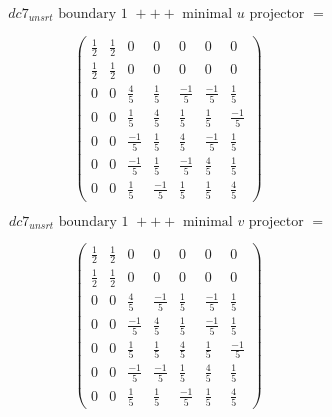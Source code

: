\documentclass[preprint]{iucr}              %
\begin{document}
{\begin{itemize}
{\[dc7_{unsrt} \text{ boundary 1 } +++ \text{ minimal }u \text{ projector } =\]
\begin{center}
\begin{equation*}
\begin{pmatrix}
\frac{1}{2}&\frac{1}{2}&0&0&0&0&0\\[.25em]
\frac{1}{2}&\frac{1}{2}&0&0&0&0&0\\[.25em]
0&0&\frac{4}{5}&\frac{1}{5}&\frac{-1}{5}&\frac{-1}{5}&\frac{1}{5}\\[.25em]
0&0&\frac{1}{5}&\frac{4}{5}&\frac{1}{5}&\frac{1}{5}&\frac{-1}{5}\\[.25em]
0&0&\frac{-1}{5}&\frac{1}{5}&\frac{4}{5}&\frac{-1}{5}&\frac{1}{5}\\[.25em]
0&0&\frac{-1}{5}&\frac{1}{5}&\frac{-1}{5}&\frac{4}{5}&\frac{1}{5}\\[.25em]
0&0&\frac{1}{5}&\frac{-1}{5}&\frac{1}{5}&\frac{1}{5}&\frac{4}{5}
\end{pmatrix}
\end{equation*}
\end{center}


\[dc7_{unsrt} \text{ boundary 1 } +++ \text{ minimal }v \text{ projector } =\]
\begin{center}
\begin{equation*}
\begin{pmatrix}
\frac{1}{2}&\frac{1}{2}&0&0&0&0&0\\[.25em]
\frac{1}{2}&\frac{1}{2}&0&0&0&0&0\\[.25em]
0&0&\frac{4}{5}&\frac{-1}{5}&\frac{1}{5}&\frac{-1}{5}&\frac{1}{5}\\[.25em]
0&0&\frac{-1}{5}&\frac{4}{5}&\frac{1}{5}&\frac{-1}{5}&\frac{1}{5}\\[.25em]
0&0&\frac{1}{5}&\frac{1}{5}&\frac{4}{5}&\frac{1}{5}&\frac{-1}{5}\\[.25em]
0&0&\frac{-1}{5}&\frac{-1}{5}&\frac{1}{5}&\frac{4}{5}&\frac{1}{5}\\[.25em]
0&0&\frac{1}{5}&\frac{1}{5}&\frac{-1}{5}&\frac{1}{5}&\frac{4}{5}
\end{pmatrix}
\end{equation*}
\end{center}


}
\end{itemize}}
\end{document}
